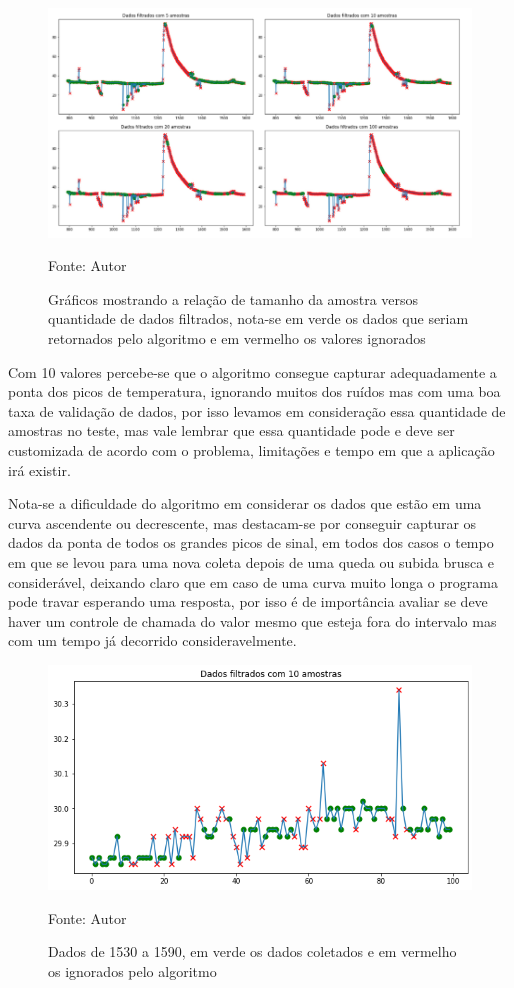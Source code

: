 \begin{figure}[H]
	\centering
	\includegraphics[width=15cm]{imagens/sensores/graficos_tamanhos_amostras.jpg}
	\caption{Gráficos mostrando a relação de tamanho da amostra versos quantidade de dados filtrados, nota-se em verde os dados que seriam retornados pelo algoritmo e em vermelho os valores ignorados}
	Fonte: Autor
	\label{fig: graficos_tamanhos_amostras}
\end{figure}

Com 10 valores percebe-se que o algoritmo consegue capturar adequadamente a ponta dos picos de temperatura, ignorando muitos dos ruídos mas com uma boa taxa de validação de dados, por isso levamos em consideração essa quantidade de amostras no teste, mas vale lembrar que essa quantidade pode e deve ser customizada de acordo com o problema, limitações e tempo em que a aplicação irá existir.

Nota-se a dificuldade do algoritmo em considerar os dados que estão em uma curva ascendente ou decrescente, mas destacam-se por conseguir capturar os dados da ponta de todos os grandes picos de sinal, em todos dos casos o tempo em que se levou para uma nova coleta depois de uma queda ou subida brusca e considerável, deixando claro que em caso de uma curva muito longa o programa pode travar esperando uma resposta, por isso é de importância avaliar se deve haver um controle de chamada do valor mesmo que esteja fora do intervalo mas com um tempo já decorrido consideravelmente.


\begin{figure}[H]
	\centering
	\includegraphics[width=15cm]{imagens/sensores/filtrado_100_ultimas.png}
	\caption{Dados de 1530 a 1590, em verde os dados coletados e em vermelho os ignorados pelo algoritmo}
	Fonte: Autor
	\label{fig: indice}
\end{figure}


